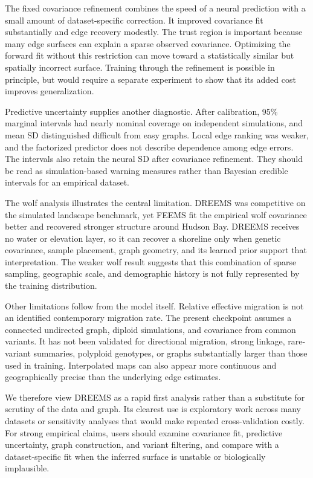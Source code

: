 \documentclass[11pt]{article}
\newcommand{\dreems}{DREEMS\xspace}
\newcommand{\feems}{FEEMS\xspace}
\begin{document}
The fixed covariance refinement combines the speed of a neural prediction
with a small amount of dataset-specific correction. It improved covariance fit
substantially and edge recovery modestly. The trust region is important because
many edge surfaces can explain a sparse observed covariance. Optimizing the
forward fit without this restriction can move toward a statistically similar
but spatially incorrect surface. Training through the refinement is possible
in principle, but would require a separate experiment to show that its added
cost improves generalization.

Predictive uncertainty supplies another diagnostic. After calibration, 95\%
marginal intervals had nearly nominal coverage on independent simulations,
and mean SD distinguished difficult from easy graphs. Local edge ranking was
weaker, and the factorized predictor does not describe dependence among edge
errors. The intervals also retain the neural SD after covariance refinement.
They should be read as simulation-based warning measures rather than Bayesian
credible intervals for an empirical dataset.

The wolf analysis illustrates the central limitation. \dreems was competitive
on the simulated landscape benchmark, yet \feems fit the empirical wolf
covariance better and recovered stronger structure around Hudson Bay. \dreems
receives no water or elevation layer, so it can recover a shoreline only when
genetic covariance, sample placement, graph geometry, and its learned prior
support that interpretation. The weaker wolf result suggests that this
combination of sparse sampling, geographic scale, and demographic history is
not fully represented by the training distribution.

Other limitations follow from the model itself. Relative effective migration
is not an identified contemporary migration rate. The present checkpoint
assumes a connected undirected graph, diploid simulations, and covariance from
common variants. It has not been validated for directional migration, strong
linkage, rare-variant summaries, polyploid genotypes, or graphs substantially
larger than those used in training. Interpolated maps can also appear more
continuous and geographically precise than the underlying edge estimates.

We therefore view \dreems as a rapid first analysis rather than a substitute
for scrutiny of the data and graph. Its clearest use is exploratory work across
many datasets or sensitivity analyses that would make repeated
cross-validation costly. For strong empirical claims, users should examine
covariance fit, predictive uncertainty, graph construction, and variant
filtering, and compare with a dataset-specific fit when the inferred surface
is unstable or biologically implausible.
\end{document}
